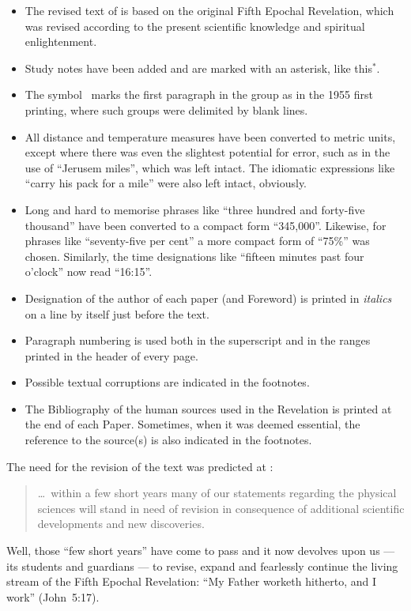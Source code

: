 \begin{itemize}
\item The revised text of  is based on the original Fifth Epochal Revelation,
which was revised according to the present scientific knowledge and spiritual enlightenment.
\item Study notes have been added and are marked with an asterisk, like this$^*$.
\item The symbol \pc\ marks the first paragraph in the group as in the 1955 first printing, where such groups were delimited by blank lines.
\item All distance and temperature measures have been converted to metric units, except where there was even the slightest potential for error, such as in the use of ``Jerusem miles'', which was left intact. The idiomatic expressions like ``carry his pack for a mile'' were also left intact, obviously.
\item Long and hard to memorise phrases like ``three hundred and forty\hyp{}five thousand'' have been converted to a compact form ``345,000''. Likewise, for phrases like ``seventy\hyp{}five per cent'' a more compact form of ``75\%'' was chosen. Similarly, the time designations like ``fifteen minutes past four o’clock'' now read ``16:15''.
\item Designation of the author of each paper (and Foreword) is printed in \textit{italics} on a line by itself just before the text.
\item Paragraph numbering is used both in the superscript and in the ranges printed in the head\-er of every page.
\item Possible textual corruptions are indicated in the footnotes.
\item The Bibliography of the human sources used in the Revelation is printed at the end of each Paper.
      Sometimes, when it was deemed essential, the reference to the source(s) is also indicated in the footnotes.
\end{itemize}

The need for the revision of the text was predicted at :

\begin{quote}
\ldots\ within a few short years many of our statements regarding the physical sciences will stand in need of revision in consequence of additional scientific developments and new discoveries.
\end{quote}

Well, those ``few short years'' have come to pass and it now devolves upon us --- its students and guardians --- to revise,
expand and fearlessly continue the living stream of the Fifth Epochal Revelation:
``My Father worketh hitherto, and I work'' (John~5:17).

